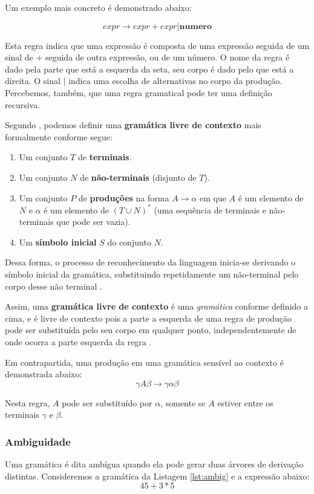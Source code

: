 Um exemplo mais concreto é demonstrado abaixo:

\[
expr \rightarrow expr + expr | \textbf{numero}
\]

Esta regra indica que uma expressão é composta de uma expressão seguida de um
sinal de + seguida de outra expressão, ou de um número. O nome da regra é dado
pela parte que está a esquerda da seta, seu corpo é dado pelo que está a
direita. O sinal \(|\) indica uma escolha de alternativas no corpo da
produção. Percebemos, também, que uma regra gramatical pode ter uma
definição recursiva.

Segundo , podemos definir uma \textbf{gramática livre de
contexto} mais formalmente conforme segue:
\begin{enumerate}
	\item Um conjunto \(T\) de \textbf{terminais}.
	\item Um conjunto \(N\) de \textbf{não-terminais} (disjunto de \(T\)).
	\item Um conjunto \(P\) de \textbf{produções} na forma \(A \rightarrow \alpha\)
				em que \(A\) é um elemento de \(N\) e \(\alpha\) é um elemento de
				\((T \cup N)^*\) (uma sequência de terminais e não-terminais que
				pode ser vazia).
	\item Um \textbf{símbolo inicial} \(S\) do conjunto \(N\).
\end{enumerate}

Dessa forma, o processo de reconhecimento da linguagem inicia-se derivando o
símbolo inicial da gramática, substituindo repetidamente um não-terminal pelo
corpo desse não terminal \cite{new-dragon-pt}.

Assim, uma \textbf{gramática livre de contexto} é uma \emph{gramática}
conforme definido a cima, e é livre de contexto pois a parte a esquerda de uma
regra de produção pode ser substituída pelo seu corpo em qualquer ponto,
independentemente de onde ocorra a parte esquerda da regra \cite{louden97-pt}.

Em contrapartida, uma produção em uma gramática sensível ao contexto é demonstrada
abaixo:
\[
	\gamma{}A{}\beta \rightarrow \gamma\alpha\beta
\]

Nesta regra, \(A\) pode ser substituído por \(\alpha\), somente se
\(A\) estiver entre os terminais \(\gamma\) e \(\beta\).

\subsubsection{Ambiguidade}
Uma gramática é dita ambígua quando ela pode gerar duas árvores de derivação
distintas. Consideremos a gramática da Listagem \ref{lst:ambig} e a expressão
abaixo:
$$
45 + 3 * 5
$$

